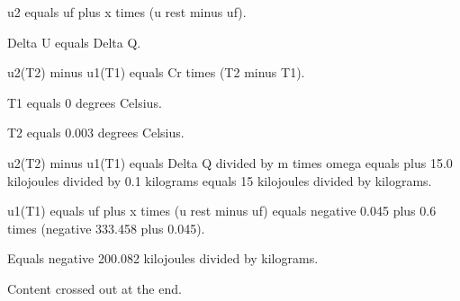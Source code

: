 u2 equals uf plus x times (u rest minus uf).

Delta U equals Delta Q.

u2(T2) minus u1(T1) equals Cr times (T2 minus T1).

T1 equals 0 degrees Celsius.

T2 equals 0.003 degrees Celsius.

u2(T2) minus u1(T1) equals Delta Q divided by m times omega equals plus 15.0 kilojoules divided by 0.1 kilograms equals 15 kilojoules divided by kilograms.

u1(T1) equals uf plus x times (u rest minus uf) equals negative 0.045 plus 0.6 times (negative 333.458 plus 0.045).

Equals negative 200.082 kilojoules divided by kilograms.

Content crossed out at the end.